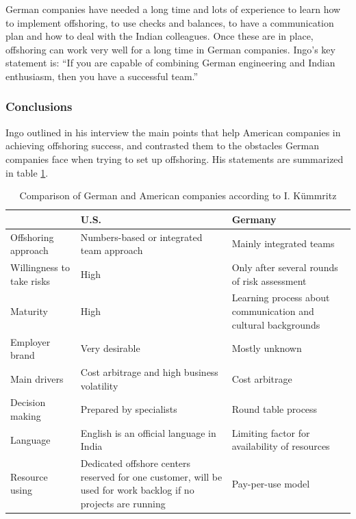 German companies have needed a long time and lots of experience to learn how to implement offshoring, to use checks and balances, to have a communication plan and how to deal with the Indian colleagues. Once these are in place, offshoring can work very well for a long time in German companies. Ingo's key statement is: ``If you are capable of combining German engineering and Indian enthusiasm, then you have a successful team.''

\subsubsection{Conclusions}

Ingo outlined in his interview the main points that help American companies in achieving offshoring success, and contrasted them to the obstacles German companies face when trying to set up offshoring. His statements are summarized in table \ref{tab:IngoComparison}.

\vspace{3mm}
\begin{table}[htb]
	\centering
	\begin{tabular}{l|p{5.2cm}|p{5.2cm}}
		& \textbf{U.S.} & \textbf{Germany}\\\hline
		\rule{0pt}{3ex}Offshoring approach&Numbers-based or integrated team approach &Mainly integrated teams \\ \hline
		\rule{0pt}{3ex}Willingness to take risks& High & Only after several rounds of risk assessment \\ \hline
		\rule{0pt}{3ex}Maturity &High & Learning process about communication and cultural backgrounds \\ \hline
		\rule{0pt}{3ex}Employer brand&Very desirable &Mostly unknown \\ \hline
		\rule{0pt}{3ex}Main drivers&Cost arbitrage and high business volatility &Cost arbitrage \\ \hline
		\rule{0pt}{3ex}Decision making &Prepared by specialists & Round table process \\ \hline
		\rule{0pt}{3ex}Language &English is an official language in India & Limiting factor for availability of resources \\ \hline
		\rule{0pt}{3ex}Resource using &Dedicated offshore centers reserved for one customer, will be used for work backlog if no projects are running& Pay-per-use model\\ \hline
	\end{tabular}
	\vspace{3mm}
	\caption{Comparison of German and American companies according to I. K\"ummritz}
	\label{tab:IngoComparison}
\end{table}

